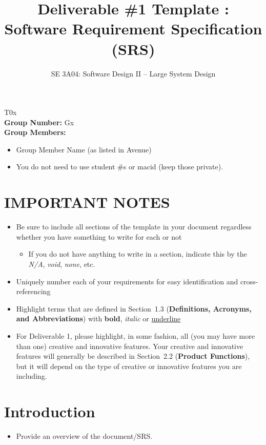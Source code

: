 \documentclass[]{article}
\title{Deliverable \#1 Template : Software Requirement Specification (SRS)}
\author{SE 3A04: Software Design II -- Large System Design}
\date{}
\begin{document}
\maketitle	
{} T0x\\
{\bf Group Number:} Gx \\
{\bf Group Members:} 
\begin{itemize}
	\item Group Member Name (as listed in Avenue)
	\item You do not need to use student \#s or macid (keep those private).
\end{itemize}

\section*{IMPORTANT NOTES}
\begin{itemize}
	\item Be sure to include all sections of the template in your document regardless whether you have something to write for each or not
	\begin{itemize}
		\item If you do not have anything to write in a section, indicate this by the \emph{N/A}, \emph{void}, \emph{none}, etc.
	\end{itemize}
	\item Uniquely number each of your requirements for easy identification and cross-referencing
	\item Highlight terms that are defined in Section~1.3 (\textbf{Definitions, Acronyms, and Abbreviations}) with \textbf{bold}, \emph{italic} or \underline{underline}
	\item For Deliverable 1, please highlight, in some fashion, all (you may have more than one) creative and innovative features. Your creative and innovative features will generally be described in Section~2.2 (\textbf{Product Functions}), but it will depend on the type of creative or innovative features you are including.
\end{itemize}

\newpage
\section{Introduction}
\label{sec:introduction}

\begin{itemize}
	\item Provide an overview of the document/SRS.
\end{itemize}
\end{document}
